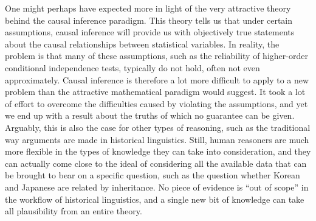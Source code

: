 One might perhaps have expected more in light of the very attractive theory behind the causal inference paradigm. This theory tells us that under certain assumptions, causal inference will provide us with objectively true statements about the causal relationships between statistical variables. In reality, the problem is that many of these assumptions, such as the reliability of higher-order conditional independence tests, typically do not hold, often not even approximately. Causal inference is therefore a lot more difficult to apply to a new problem than the attractive mathematical paradigm would suggest. It took a lot of effort to overcome the difficulties caused by violating the assumptions, and yet we end up with a result about the truths of which no guarantee can be given. Arguably, this is also the case for other types of reasoning, such as the traditional way arguments are made in historical linguistics. Still, human reasoners are much more flexible in the types of knowledge they can take into consideration, and they can actually come close to the ideal of considering all the available data that can be brought to bear on a specific question, such as the question whether Korean and Japanese are related by inheritance. No piece of evidence is ``out of scope'' in the workflow of historical linguistics, and a single new bit of knowledge can take all plausibility from an entire theory.

